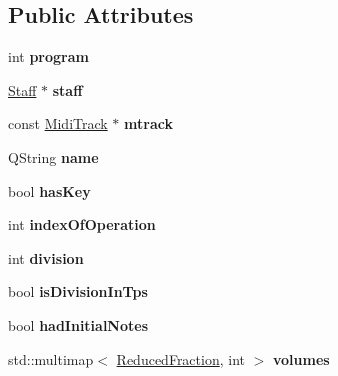 \subsection*{Public Attributes}
\begin{DoxyCompactItemize}
\item 
\mbox{\label{class_ms_1_1_m_track_a3bd81928cc1473b3d553160380226ced}} 
int {\bfseries program}
\item 
\mbox{\label{class_ms_1_1_m_track_a5023531607b12a8a22051aec9a85d341}} 
\hyperlink{class_ms_1_1_staff}{Staff} $\ast$ {\bfseries staff}
\item 
\mbox{\label{class_ms_1_1_m_track_ac8bbf88361be72df8cf20afbb6924a44}} 
const \hyperlink{class_ms_1_1_midi_track}{Midi\+Track} $\ast$ {\bfseries mtrack}
\item 
\mbox{\label{class_ms_1_1_m_track_a9279e8b51585be5c95b7477345fe06b8}} 
Q\+String {\bfseries name}
\item 
\mbox{\label{class_ms_1_1_m_track_a2f7b2e6098cfe99bd3a9c51b2d0fa34e}} 
bool {\bfseries has\+Key}
\item 
\mbox{\label{class_ms_1_1_m_track_a1dc50a307db4599c86ab42ad33173799}} 
int {\bfseries index\+Of\+Operation}
\item 
\mbox{\label{class_ms_1_1_m_track_a56ece03d2342dce05e91f1cadb6d68cb}} 
int {\bfseries division}
\item 
\mbox{\label{class_ms_1_1_m_track_a9b4fd2b00c2ef5034b9637e0dc43e2e6}} 
bool {\bfseries is\+Division\+In\+Tps}
\item 
\mbox{\label{class_ms_1_1_m_track_a985595462b9aa274d48c8d5c51ad7476}} 
bool {\bfseries had\+Initial\+Notes}
\item 
\mbox{\label{class_ms_1_1_m_track_ab717a5805387914b2dfa86ddfebafa97}} 
std\+::multimap$<$ \hyperlink{class_ms_1_1_reduced_fraction}{Reduced\+Fraction}, int $>$ {\bfseries volumes}
\item 

\end{DoxyCompactItemize}
